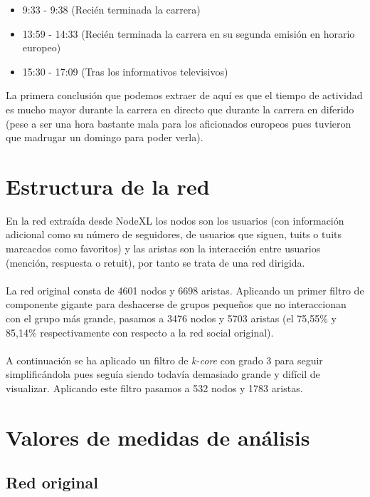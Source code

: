 \begin{itemize}
	\item 9:33 - 9:38 (Recién terminada la carrera)
	\item 13:59 - 14:33 (Recién terminada la carrera en su segunda emisión en horario europeo)
	\item 15:30 - 17:09 (Tras los informativos televisivos)
\end{itemize}

La primera conclusión que podemos extraer de aquí es que el tiempo de actividad es mucho mayor durante la carrera en directo que durante la carrera en diferido (pese a ser una hora bastante mala para los aficionados europeos pues tuvieron que madrugar un domingo para poder verla).

\section{Estructura de la red}

En la red extraída desde NodeXL los nodos son los usuarios (con información adicional como su número de seguidores, de usuarios que siguen, tuits o tuits marcacdos como favoritos) y las aristas son la interacción entre usuarios (mención, respuesta o retuit), por tanto se trata de una red dirigida.
\\ \\
La red original consta de 4601 nodos y 6698 aristas. Aplicando un primer filtro de componente gigante para deshacerse de grupos pequeños que no interaccionan con el grupo más grande, pasamos a 3476 nodos y 5703 aristas (el 75,55\% y 85,14\% respectivamente con respecto a la red social original).
\\ \\
A continuación se ha aplicado un filtro de \textit{k-core} con grado 3 para seguir simplificándola pues seguía siendo todavía demasiado grande y difícil de visualizar. Aplicando este filtro pasamos a 532 nodos y 1783 aristas.

\section{Valores de medidas de análisis}
\label{sec:medidas}

\subsection{Red original}


